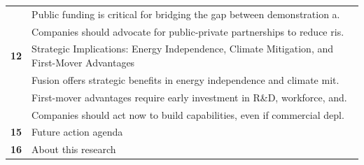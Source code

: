 \documentclass[10pt,a4paper]{article}
\begin{document}
\begin{tabularx}{\linewidth}{p{14mm}Y}
 & {\scriptsize\color{BOMuted} Public funding is critical for bridging the gap between demonstration a.} \\[1pt]
 & {\scriptsize\color{BOMuted} Companies should advocate for public-private partnerships to reduce ris.} \\[1pt]
\textcolor{BOGreen}{\bfseries 12} & Strategic Implications: Energy Independence, Climate Mitigation, and First-Mover Advantages \\[5pt]
 & {\scriptsize\color{BOMuted} Fusion offers strategic benefits in energy independence and climate mit.} \\[1pt]
 & {\scriptsize\color{BOMuted} First-mover advantages require early investment in R\&D, workforce, and.} \\[1pt]
 & {\scriptsize\color{BOMuted} Companies should act now to build capabilities, even if commercial depl.} \\[1pt]
\textcolor{BOGreen}{\bfseries 15} & Future action agenda \\[5pt]
\textcolor{BOGreen}{\bfseries 16} & About this research \\[5pt]
\end{tabularx}
\clearpage
\end{document}
